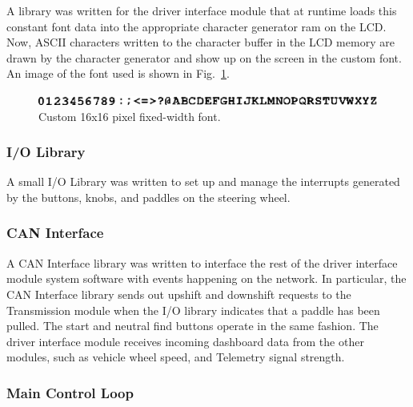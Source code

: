 A library was written for the driver interface module that at runtime loads this constant font data into the appropriate character generator ram on the LCD. Now, ASCII characters written to the character buffer in the LCD memory are drawn by the character generator and show up on the screen in the custom font. An image of the font used is shown in Fig.\ \ref{fig:driver_interface_font}.

\begin{figure}[htp]
 \centering
 \includegraphics[scale=1]{implementation/figures/driver_interface_font.eps}
 \caption{Custom 16x16 pixel fixed-width font.}
 \label{fig:driver_interface_font}
\end{figure}

\subsubsection{I/O Library}

A small I/O Library was written to set up and manage the interrupts generated by the buttons, knobs, and paddles on the steering wheel.
 
% 
% 
% 
% 


\subsubsection{CAN Interface}

A CAN Interface library was written to interface the rest of the driver interface module system software with events happening on the network. In particular, the CAN Interface library sends out upshift and downshift requests to the Transmission module when the I/O library indicates that a paddle has been pulled. The start and neutral find buttons operate in the same fashion. The driver interface module receives incoming dashboard data from the other modules, such as vehicle wheel speed, and Telemetry signal strength.

\subsubsection{Main Control Loop}